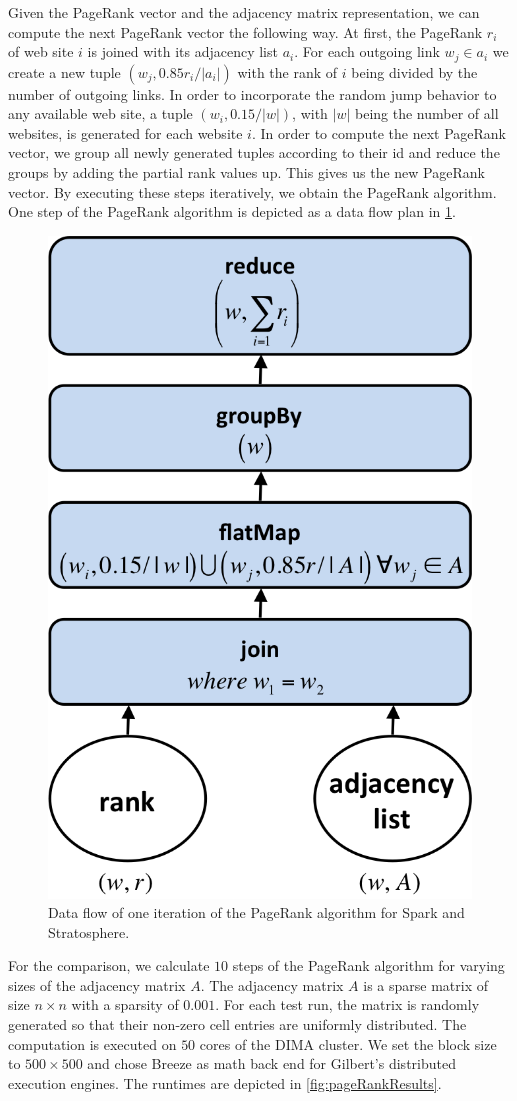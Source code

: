 Given the PageRank vector and the adjacency matrix representation, we can compute the next PageRank vector the following way.
At first, the PageRank $r_i$ of web site $i$ is joined with its adjacency list $a_i$.
For each outgoing link $w_j \in a_i$ we create a new tuple $(w_j, 0.85r_i/\left|a_i\right|)$ with the rank of $i$ being divided by the number of outgoing links.
In order to incorporate the random jump behavior to any available web site, a tuple $(w_i, 0.15/|w|)$, with $|w|$ being the number of all websites, is generated for each website $i$.
In order to compute the next PageRank vector, we group all newly generated tuples according to their id and reduce the groups by adding the partial rank values up.
This gives us the new PageRank vector.
By executing these steps iteratively, we obtain the PageRank algorithm.
One step of the PageRank algorithm is depicted as a data flow plan in \cref{fig:pageRankDataFlow}.

\begin{figure}[!h]
	\centering
	\includegraphics[width=.3\linewidth]{images/pageRankStep.png}
	\caption{Data flow of one iteration of the PageRank algorithm for Spark and Stratosphere.}
	\label{fig:pageRankDataFlow}
\end{figure}

For the comparison, we calculate $10$ steps of the PageRank algorithm for varying sizes of the adjacency matrix $A$.
The adjacency matrix $A$ is a sparse matrix of size $n \times n$ with a sparsity of $0.001$.
For each test run, the matrix is randomly generated so that their non-zero cell entries are uniformly distributed.
The computation is executed on $50$ cores of the DIMA cluster.
We set the block size to $500 \times 500$ and chose Breeze as math back end for Gilbert's distributed execution engines.
The runtimes are depicted in \cref{fig:pageRankResults}.

